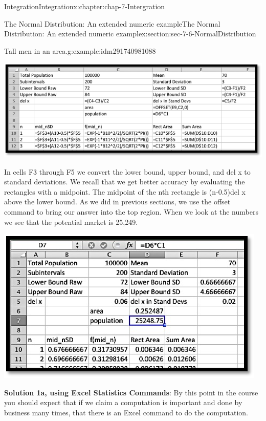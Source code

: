\documentclass[oneside,10pt,]{book}
\newcommand{\terminology}[1]{\textbf{#1}}
\numberwithin{equation}{section}
\begin{document}
\begin{chapterptx}{Integration}{}{Integration}{}{}{x:chapter:chap-7-Intergration}
\begin{sectionptx}{The Normal Distribution: An extended numeric example}{}{The Normal Distribution: An extended numeric example}{}{}{x:section:sec-7-6-NormalDistribution}
\begin{example}{Tall men in an area.}{g:example:idm291740981088}
\begin{sidebyside}{1}{0.1}{0.1}{0}%
\begin{sbspanel}{0.8}%
\includegraphics[width=\linewidth]{images/sec7-6-2.png}
\end{sbspanel}%
\end{sidebyside}%
\par
In cells F3 through F5 we convert the lower bound, upper bound, and del x to standard deviations.  We recall that we get better accuracy by evaluating the rectangles with a midpoint.  The midpoint of the nth rectangle is (n-0.5)\textasteriskcentered{}del x above the lower bound.  As we did in previous sections, we use the offset command to bring our answer into the top region.  When we look at the numbers we see that the potential market is 25,249.%
\begin{sidebyside}{1}{0.25}{0.25}{0}%
\begin{sbspanel}{0.5}%
\includegraphics[width=\linewidth]{images/sec7-6-3.png}
\end{sbspanel}%
\end{sidebyside}%
\par
\terminology{Solution 1a, using Excel Statistics Commands}:  By this point in the course you should expect that if we claim a computation is important and done by business many times, that there is an Excel command to do the computation.%

\end{example}
\end{sectionptx}
\end{chapterptx}
\end{document}
